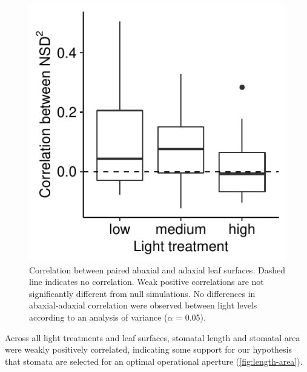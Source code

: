 \documentclass[12pt,halfline,a4paper,]{ouparticle}
\begin{document}
\begin{figure}[ht]
\includegraphics[width = \textwidth]{figures/dual-surface.pdf}
\caption{Correlation between paired abaxial and adaxial leaf surfaces. Dashed line indicates no correlation. Weak positive correlations are not significantly different from null simulations. No differences in abaxial-adaxial correlation were observed between light levels according to an analysis of variance ($\alpha$ = 0.05).}
\label{fig:dual-surface}
\end{figure}

Across all light treatments and leaf surfaces, stomatal length and
stomatal area were weakly positively correlated, indicating some support
for our hypothesis that stomata are selected for an optimal operational
aperture (\autoref{fig:length-area}).
\end{document}
